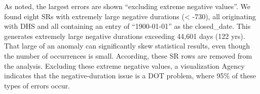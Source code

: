 \documentclass[12pt, titlepage]{article}
\begin{document}

	
As noted, the largest errors are shown ``excluding extreme negative values''. We found 
eight SRs with extremely large negative durations (\textless{} -730), all originating
with DHS and all containing an entry of ``1900-01-01'' as the closed\_date. This 
generates extremely large negative durations exceeding 44,601 
days (122 yrs). That large of an anomaly can significantly skew statistical 
results, even though the number of occurrences is small. According, these 
SR rows are removed from the analysis. Excluding these extreme negative
values, a visualization Agency indicates that the negative-duration 
issue is a DOT problem, where 95\% of these types of errors occur. 
	
\end{document}

